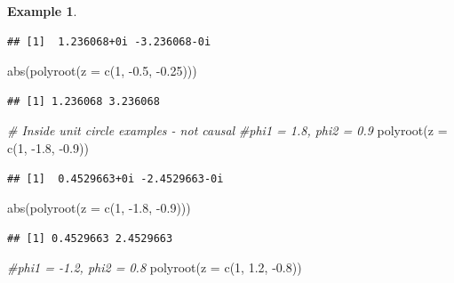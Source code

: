 \documentclass[
]{book}
\newenvironment{Shaded}{\begin{snugshade}}{\end{snugshade}}
\newcommand{\AttributeTok}[1]{\textcolor[rgb]{0.77,0.63,0.00}{#1}}
\newcommand{\CommentTok}[1]{\textcolor[rgb]{0.56,0.35,0.01}{\textit{#1}}}
\newcommand{\DecValTok}[1]{\textcolor[rgb]{0.00,0.00,0.81}{#1}}
\newcommand{\FloatTok}[1]{\textcolor[rgb]{0.00,0.00,0.81}{#1}}
\newcommand{\FunctionTok}[1]{\textcolor[rgb]{0.00,0.00,0.00}{#1}}
\newcommand{\NormalTok}[1]{#1}
\newcommand{\SpecialCharTok}[1]{\textcolor[rgb]{0.00,0.00,0.00}{#1}}
\theoremstyle{definition}
\theoremstyle{definition}
\newtheorem{example}{Example}[chapter]
\theoremstyle{definition}
\theoremstyle{definition}
\theoremstyle{remark}
\begin{document}
\begin{example}
\begin{verbatim}
## [1]  1.236068+0i -3.236068-0i
\end{verbatim}

\begin{Shaded}
\begin{Highlighting}[]
\FunctionTok{abs}\NormalTok{(}\FunctionTok{polyroot}\NormalTok{(}\AttributeTok{z =} \FunctionTok{c}\NormalTok{(}\DecValTok{1}\NormalTok{, }\SpecialCharTok{{-}}\FloatTok{0.5}\NormalTok{, }\SpecialCharTok{{-}}\FloatTok{0.25}\NormalTok{))) }
\end{Highlighting}
\end{Shaded}

\begin{verbatim}
## [1] 1.236068 3.236068
\end{verbatim}

\begin{Shaded}
\begin{Highlighting}[]
\CommentTok{\# Inside unit circle examples {-} not causal}
\CommentTok{\#phi1 = 1.8, phi2 = 0.9}
\FunctionTok{polyroot}\NormalTok{(}\AttributeTok{z =} \FunctionTok{c}\NormalTok{(}\DecValTok{1}\NormalTok{, }\SpecialCharTok{{-}}\FloatTok{1.8}\NormalTok{, }\SpecialCharTok{{-}}\FloatTok{0.9}\NormalTok{))  }
\end{Highlighting}
\end{Shaded}

\begin{verbatim}
## [1]  0.4529663+0i -2.4529663-0i
\end{verbatim}

\begin{Shaded}
\begin{Highlighting}[]
\FunctionTok{abs}\NormalTok{(}\FunctionTok{polyroot}\NormalTok{(}\AttributeTok{z =} \FunctionTok{c}\NormalTok{(}\DecValTok{1}\NormalTok{, }\SpecialCharTok{{-}}\FloatTok{1.8}\NormalTok{, }\SpecialCharTok{{-}}\FloatTok{0.9}\NormalTok{))) }
\end{Highlighting}
\end{Shaded}

\begin{verbatim}
## [1] 0.4529663 2.4529663
\end{verbatim}

\begin{Shaded}
\begin{Highlighting}[]
\CommentTok{\#phi1 = {-}1.2, phi2 = 0.8}
\FunctionTok{polyroot}\NormalTok{(}\AttributeTok{z =} \FunctionTok{c}\NormalTok{(}\DecValTok{1}\NormalTok{, }\FloatTok{1.2}\NormalTok{, }\SpecialCharTok{{-}}\FloatTok{0.8}\NormalTok{))  }
\end{Highlighting}
\end{Shaded}


\end{example}
\end{document}
